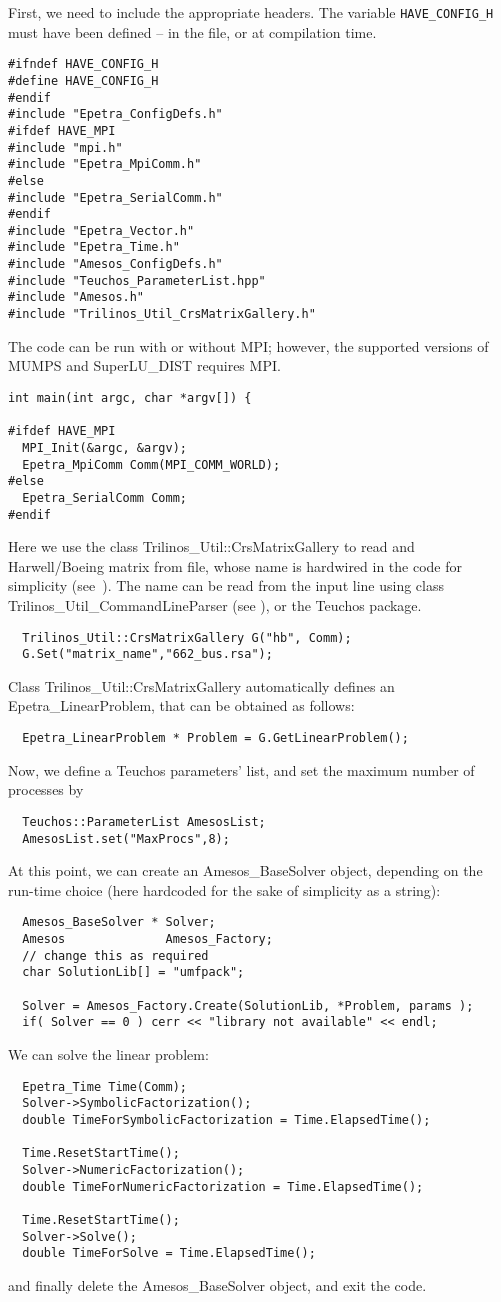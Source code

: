 \documentclass[11pt]{SANDreport}
\begin{document}
First, we need to include the appropriate headers. The variable
\verb!HAVE_CONFIG_H! must have been defined -- in the file, or at
compilation time. 
\begin{verbatim}
#ifndef HAVE_CONFIG_H
#define HAVE_CONFIG_H
#endif
#include "Epetra_ConfigDefs.h"
#ifdef HAVE_MPI
#include "mpi.h"
#include "Epetra_MpiComm.h"
#else
#include "Epetra_SerialComm.h"
#endif
#include "Epetra_Vector.h"
#include "Epetra_Time.h"
#include "Amesos_ConfigDefs.h"
#include "Teuchos_ParameterList.hpp"
#include "Amesos.h"
#include "Trilinos_Util_CrsMatrixGallery.h"
\end{verbatim}
The code can be run with or without MPI; however, the supported versions
of MUMPS and SuperLU\_DIST requires MPI.
\begin{verbatim}
int main(int argc, char *argv[]) {

#ifdef HAVE_MPI
  MPI_Init(&argc, &argv);
  Epetra_MpiComm Comm(MPI_COMM_WORLD);
#else
  Epetra_SerialComm Comm;
#endif
\end{verbatim}
Here we use the class Trilinos\_Util::CrsMatrixGallery to read and
Harwell/Boeing matrix from file, whose name is hardwired in the code for
simplicity (see~\cite[Chap 5]{TrilinosTutorial}). The name can be read from the
input line using class Trilinos\_Util\_CommandLineParser (see
\cite{Trilinos-tutorial}), or the Teuchos package.
\begin{verbatim}
  Trilinos_Util::CrsMatrixGallery G("hb", Comm);
  G.Set("matrix_name","662_bus.rsa");
\end{verbatim}
Class Trilinos\_Util::CrsMatrixGallery automatically defines an
Epetra\_LinearProblem, that can be obtained as follows:
\begin{verbatim}  
  Epetra_LinearProblem * Problem = G.GetLinearProblem();
\end{verbatim}
Now, we define a Teuchos parameters' list, and set the maximum number of
processes by
\begin{verbatim}  
  Teuchos::ParameterList AmesosList;
  AmesosList.set("MaxProcs",8);
\end{verbatim}
At this point, we can create an Amesos\_BaseSolver object, depending on
the run-time choice (here hardcoded for the sake of simplicity as a
string):
\begin{verbatim}  
  Amesos_BaseSolver * Solver;
  Amesos              Amesos_Factory;
  // change this as required
  char SolutionLib[] = "umfpack";

  Solver = Amesos_Factory.Create(SolutionLib, *Problem, params );
  if( Solver == 0 ) cerr << "library not available" << endl;
\end{verbatim}
We can solve the linear problem:
\begin{verbatim}  
  Epetra_Time Time(Comm);      
  Solver->SymbolicFactorization();
  double TimeForSymbolicFactorization = Time.ElapsedTime();
  
  Time.ResetStartTime();  
  Solver->NumericFactorization();
  double TimeForNumericFactorization = Time.ElapsedTime();
   
  Time.ResetStartTime();
  Solver->Solve();
  double TimeForSolve = Time.ElapsedTime();
\end{verbatim}
and finally delete the Amesos\_BaseSolver object, and exit the code.
\end{document}
